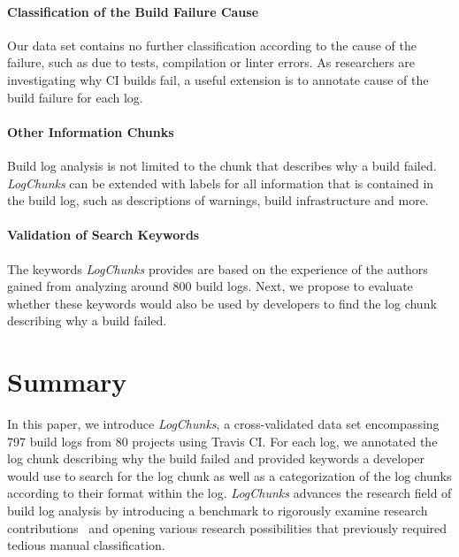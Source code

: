 \documentclass[sigconf]{acmart}
\newcommand{\logchunks}{\emph{LogChunks}\xspace}
\begin{document}
\paragraph{Classification of the Build Failure Cause}
Our data set contains no further classification according to the cause of the failure, such as due to tests, compilation or linter errors.
As researchers are investigating why CI builds fail, a useful extension is to annotate cause of the build failure for each log.

\paragraph{Other Information Chunks}
Build log analysis is not limited to the chunk that describes why a build failed.
\logchunks can be extended with labels for all information that is contained in the build log, such as descriptions of warnings, build infrastructure and more.

\paragraph{Validation of Search Keywords}
The keywords \logchunks provides are based on the experience of the authors gained from analyzing around 800 build logs.
Next, we propose to evaluate whether these keywords would also be used by developers to find the log chunk describing why a build failed.



\section{Summary}
\label{sec:conclusion}
In this paper, we introduce \logchunks, a cross-validated data
set encompassing 797 build logs from 80 projects using Travis CI\@.
For each log, we annotated the log chunk describing why the build
failed and provided keywords a developer would use to search for the
log chunk as well as a categorization of the log chunks according to
their format within the log. \logchunks advances the research
field of build log analysis by introducing a benchmark to rigorously
examine research contributions~\cite{sim2003using} and opening various
research possibilities that previously required tedious manual
classification.

\end{document}
